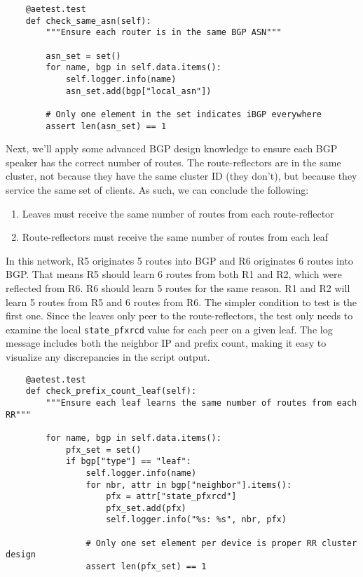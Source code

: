 \begin{verbatim}
    @aetest.test
    def check_same_asn(self):
        """Ensure each router is in the same BGP ASN"""

        asn_set = set()
        for name, bgp in self.data.items():
            self.logger.info(name)
            asn_set.add(bgp["local_asn"])

        # Only one element in the set indicates iBGP everywhere
        assert len(asn_set) == 1
\end{verbatim}

Next, we'll apply some advanced BGP design knowledge to ensure each BGP
speaker has the correct number of routes. The route-reflectors are in the same
cluster, not because they have the same cluster ID (they don't), but because
they service the same set of clients. As such, we can conclude the following:

\begin{enumerate}
  \item Leaves must receive the same number of routes from each route-reflector
  \item Route-reflectors must receive the same number of routes from each leaf
\end{enumerate}

In this network, R5 originates 5 routes into BGP and R6 originates 6 routes into
BGP\@. That means R5 should learn 6 routes from both R1 and R2, which were
reflected from R6. R6 should learn 5 routes for the same reason. R1 and R2
will learn 5 routes from R5 and 6 routes from R6. The simpler condition to test
is the first one. Since the leaves only peer to the route-reflectors, the test
only needs to examine the local \verb|state_pfxrcd| value for each peer on a
given leaf. The log message includes both the neighbor IP and prefix count,
making it easy to visualize any discrepancies in the script output.

\begin{verbatim}
    @aetest.test
    def check_prefix_count_leaf(self):
        """Ensure each leaf learns the same number of routes from each RR"""

        for name, bgp in self.data.items():
            pfx_set = set()
            if bgp["type"] == "leaf":
                self.logger.info(name)
                for nbr, attr in bgp["neighbor"].items():
                    pfx = attr["state_pfxrcd"]
                    pfx_set.add(pfx)
                    self.logger.info("%s: %s", nbr, pfx)

                # Only one set element per device is proper RR cluster design
                assert len(pfx_set) == 1
\end{verbatim}


